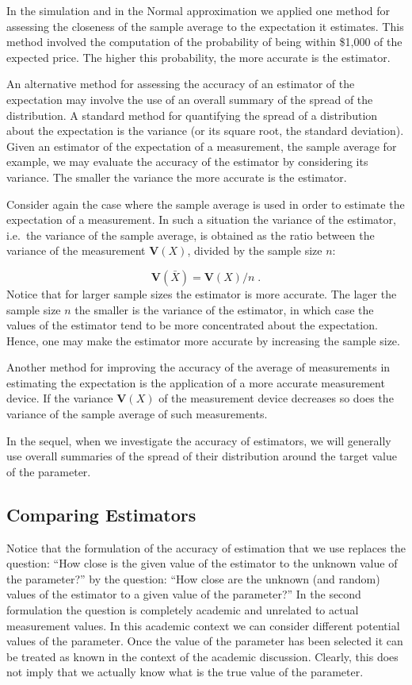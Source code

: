 \documentclass[
]{krantz}
\newcommand{\Var}{\mathbf{V}}
\theoremstyle{definition}
\theoremstyle{definition}
\theoremstyle{definition}
\theoremstyle{remark}
\begin{document}
In the simulation and in the Normal approximation we applied one method
for assessing the closeness of the sample average to the expectation it
estimates. This method involved the computation of the probability of
being within \$1,000 of the expected price. The higher this probability,
the more accurate is the estimator.

An alternative method for assessing the accuracy of an estimator of the
expectation may involve the use of an overall summary of the spread of
the distribution. A standard method for quantifying the spread of a
distribution about the expectation is the variance (or its square root,
the standard deviation). Given an estimator of the expectation of a
measurement, the sample average for example, we may evaluate the
accuracy of the estimator by considering its variance. The smaller the
variance the more accurate is the estimator.

Consider again the case where the sample average is used in order to
estimate the expectation of a measurement. In such a situation the
variance of the estimator, i.e.~the variance of the sample average, is
obtained as the ratio between the variance of the measurement \(\Var(X)\),
divided by the sample size \(n\):

\[\Var(\bar X) = \Var(X)/n\;.\] Notice
that for larger sample sizes the estimator is more accurate. The lager
the sample size \(n\) the smaller is the variance of the estimator, in
which case the values of the estimator tend to be more concentrated
about the expectation. Hence, one may make the estimator more accurate
by increasing the sample size.

Another method for improving the accuracy of the average of measurements
in estimating the expectation is the application of a more accurate
measurement device. If the variance \(\Var(X)\) of the measurement device
decreases so does the variance of the sample average of such
measurements.

In the sequel, when we investigate the accuracy of estimators, we will
generally use overall summaries of the spread of their distribution
around the target value of the parameter.

\hypertarget{ComparingEstimators}{%
\subsection{Comparing Estimators}\label{ComparingEstimators}}

Notice that the formulation of the accuracy of estimation that we use
replaces the question: ``How close is the given value of the estimator to
the unknown value of the parameter?'' by the question: ``How close are the
unknown (and random) values of the estimator to a given value of the
parameter?'' In the second formulation the question is completely
academic and unrelated to actual measurement values. In this academic
context we can consider different potential values of the parameter.
Once the value of the parameter has been selected it can be treated as
known in the context of the academic discussion. Clearly, this does not
imply that we actually know what is the true value of the parameter.
\end{document}
